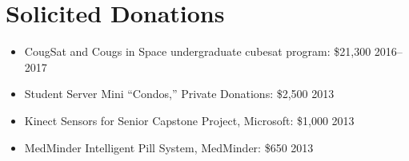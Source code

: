 \AOCLine
\section*{Solicited Donations}

\begin{itemize}
  \item{CougSat and Cougs in Space undergraduate cubesat program: \$21,300 \hfill 2016--2017}
  \item{Student Server Mini ``Condos,'' Private Donations: \$2,500 \hfill 2013}
  \item{Kinect Sensors for Senior Capstone Project, Microsoft: \$1,000 \hfill 2013}
  \item{MedMinder Intelligent Pill System, MedMinder: \$650 \hfill 2013}
\end{itemize}
